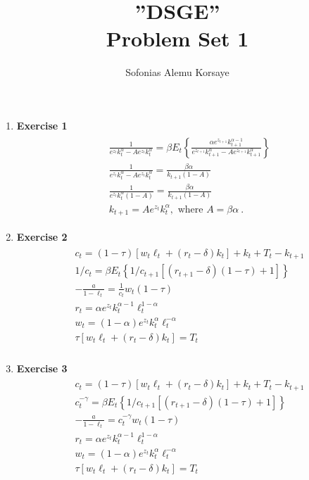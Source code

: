 \documentclass[12pt, letterpaper,bibtotoc, tablecaptionabove, figurecaptionabove]{article}
\begin{document}
\title{\bf{''DSGE''}\\  Problem Set 1}
\author{ Sofonias Alemu Korsaye}
\maketitle


\begin{enumerate}
\item{\bf{Exercise 1}}
\begin{eqnarray*}
\begin{aligned}
&\frac{1}{e^{z_{t}} k_{t}^{\alpha}-Ae^{z_t}k_t^\alpha}=
\beta E_{t}\left\{\frac{\alpha e^{z_{t+1}} k_{t+1}^{\alpha-1}}{e^{z_{t+1}} k_{t+1}^{\alpha}-Ae^{z_{t+1}}k_{t+1}^\alpha}\right\}\\
&\frac{1}{e^{z_{t}} k_{t}^{\alpha}-Ae^{z_t}k_t^\alpha}=\frac{\beta \alpha}{k_{t+1}(1-A)}\\
&\frac{1}{e^{z_{t}} k_{t}^{\alpha}(1-A)}=\frac{\beta \alpha}{k_{t+1}(1-A)}\\
&k_{t+1}=A e^{z_t}k_t^\alpha, \text{ where } A=\beta \alpha \ .
\end{aligned}
\end{eqnarray*}
\item{\bf{Exercise 2}}
\begin{eqnarray*}
\begin{aligned}
&c_{t}=(1-\tau)\left[w_{t} \ell_{t}+\left(r_{t}-\delta\right) k_{t}\right]+k_{t}+T_{t}-k_{t+1}\\
&1/c_t=\beta E_{t}\left\{1/c_{t+1}\left[\left(r_{t+1}-\delta\right)(1-\tau)+1\right]\right\}\\
&-\frac{a}{1-\ell_t}=\frac{1}{c_t} w_{t}(1-\tau)\\
&r_t=\alpha e^{z_t}k_t^{\alpha-1}\ell_t^{1-\alpha} \\
& w_t=(1-\alpha)e^{z_t}k_t^\alpha \ell_t^{-\alpha} \\ 
&{\tau\left[w_{t} \ell_{t}+\left(r_{t}-\delta\right) k_{t}\right]=T_{t}} \\ 
\end{aligned}
\end{eqnarray*}
\item{\bf{Exercise 3}}
\begin{eqnarray*}
\begin{aligned}
&c_{t}=(1-\tau)\left[w_{t} \ell_{t}+\left(r_{t}-\delta\right) k_{t}\right]+k_{t}+T_{t}-k_{t+1}\\
&c_t^{-\gamma}=\beta E_{t}\left\{1/c_{t+1}\left[\left(r_{t+1}-\delta\right)(1-\tau)+1\right]\right\}\\
&-\frac{a}{1-\ell_t}=c_t^{-\gamma} w_{t}(1-\tau)\\
&r_t=\alpha e^{z_t}k_t^{\alpha-1}\ell_t^{1-\alpha} \\
& w_t=(1-\alpha)e^{z_t}k_t^\alpha \ell_t^{-\alpha} \\ 
&{\tau\left[w_{t} \ell_{t}+\left(r_{t}-\delta\right) k_{t}\right]=T_{t}} \\ 
\end{aligned}
\end{eqnarray*}


\end{enumerate}
\end{document}
